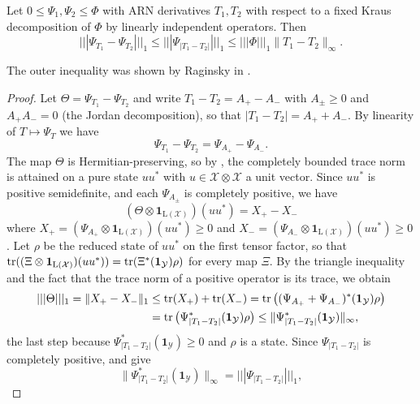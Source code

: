 \begin{lemma}\label{cont:lipschitz inequality}
Let $0\leq \Psi_1,\Psi_2\leq \Phi$ with ARN derivatives $T_1,T_2$ with respect to a fixed Kraus decomposition of $\Phi$ by linearly independent operators. Then 
\[
    |||\Psi_{T_1}-\Psi_{T_2}|||_1\leq |||\Psi_{|T_1-T_2|}|||_1\leq |||\Phi|||_1\|T_1-T_2\|_\infty.
\]
\end{lemma}
\begin{remark}
    The outer inequality was shown by Raginsky in \cite{Raginsky2003}.
\end{remark}
\begin{proof}
    Let $\Theta=\Psi_{T_1}-\Psi_{T_2}$ and write $T_1-T_2=A_+-A_-$ with $A_\pm\geq 0$ and $A_+A_-=0$ (the Jordan decomposition), so that $|T_1-T_2|=A_++A_-$. By linearity of $T\mapsto\Psi_T$ we have 
    \[
        \Psi_{T_1}-\Psi_{T_2}=\Psi_{A_+}-\Psi_{A_-}.
    \]
    The map $\Theta$ is Hermitian-preserving, so by \cite[Section~3.3]{watrous2018theory}, the completely bounded trace norm is attained on a pure state $uu^*$ with $u\in \mathcal{X}\otimes \mathcal{X}$ a unit vector. Since $uu^*$ is positive semidefinite, and each $\Psi_{A_{\pm}}$ is completely positive, we have 
    \[
        (\Theta\otimes \mathbf{1}_{\mathrm{L}(\mathcal{X})})(uu^*)=X_+-X_- 
    \]
    where $X_+=(\Psi_{A_+}\otimes \mathbf{1}_{\mathrm{L}(\mathcal{X})})(uu^*)\geq 0$ and $X_-=(\Psi_{A_-}\otimes \mathbf{1}_{\mathrm{L}(\mathcal{X})})(uu^*)\geq0$. Let $\rho$ be the reduced state of $uu^*$ on the first tensor factor, so that $\operatorname{tr}((\Xi\otimes\mathbf{1}_{\mathrm{L}(\mathcal{X})})(uu^*))=\operatorname{tr}(\Xi^*(\mathbf{1}_{\mathcal{Y}})\rho)$ for every map $\Xi$. By the triangle inequality and the fact that the trace norm of a positive operator is its trace, we obtain
    \[
        \begin{aligned}
        |||\Theta|||_1=\|X_+-X_-\|_1&\leq \operatorname{tr}(X_+)+\operatorname{tr}(X_-)=\operatorname{tr}\big((\Psi_{A_+}+\Psi_{A_-})^*(\mathbf{1}_{\mathcal{Y}})\rho\big)\\
        &=\operatorname{tr}\big(\Psi_{|T_1-T_2|}^*(\mathbf{1}_{\mathcal{Y}})\rho\big)\leq \|\Psi_{|T_1-T_2|}^*(\mathbf{1}_{\mathcal{Y}})\|_\infty,
        \end{aligned}
    \]
    the last step because $\Psi_{|T_1-T_2|}^*(\mathbf{1}_{\mathcal{Y}})\geq0$ and $\rho$ is a state. Since $\Psi_{|T_1-T_2|}$ is completely positive, \cite[Proposition~3.6]{Paulsen2003} and \cite[Theorem~3]{johnston2009computing} give
    \[
        \|\Psi_{|T_1-T_2|}^*(\mathbf{1}_{\mathcal{Y}})\|_\infty =|||\Psi_{|T_1-T_2|}|||_1,
\]
\end{proof}
